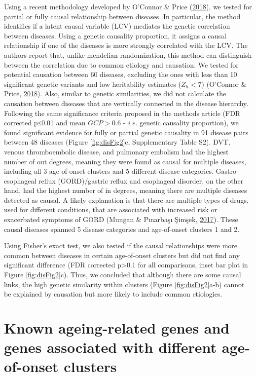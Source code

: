 \documentclass[12pt,twoside]{unicam}
\begin{document}
Using a recent methodology developed by O'Connor \& Price (\protect\hyperlink{ref-OConnor2018}{2018}), we tested for partial or fully causal relationship between diseases. In particular, the method identifies if a latent causal variable (LCV) mediates the genetic correlation between diseases. Using a genetic causality proportion, it assigns a causal relationship if one of the diseases is more strongly correlated with the LCV. The authors report that, unlike mendelian randomization, this method can distinguish between the correlation due to common etiology and causation. We tested for potential causation between 60 diseases, excluding the ones with less than 10 significant genetic variants and low heritability estimates (\(Z_h<7\)) (O'Connor \& Price, \protect\hyperlink{ref-OConnor2018}{2018}). Also, similar to genetic similarities, we did not calculate the causation between diseases that are vertically connected in the disease hierarchy. Following the same significance criteria proposed in the methods article (FDR corrected p≤0.01 and mean \(GCP>0.6\) - \emph{i.e.} genetic causality proportion), we found significant evidence for fully or partial genetic causality in 91 disease pairs between 48 diseases (Figure \ref{fig:disFig2}c, Supplementary Table S2). DVT, venous thromboembolic disease, and pulmonary embolism had the highest number of out degrees, meaning they were found as causal for multiple diseases, including all 3 age-of-onset clusters and 5 different disease categories. Gastro-esophageal reflux (GORD)/gastric reflux and esophageal disorder, on the other hand, had the highest number of in degrees, meaning there are multiple diseases detected as causal. A likely explanation is that there are multiple types of drugs, used for different conditions, that are associated with increased risk or exacerbated symptoms of GORD (Mungan \& Pınarbaşı Şimşek, \protect\hyperlink{ref-Mungan2017}{2017}). These causal diseases spanned 5 disease categories and age-of-onset clusters 1 and 2.

Using Fisher's exact test, we also tested if the causal relationships were more common between diseases in certain age-of-onset clusters but did not find any significant difference (FDR corrected p\textgreater0.1 for all comparisons, inset bar plot in Figure \ref{fig:disFig2}c). Thus, we concluded that although there are some causal links, the high genetic similarity within clusters (Figure \ref{fig:disFig2}a-b) cannot be explained by causation but more likely to include common etiologies.

\hypertarget{known-ageing-related-genes-and-genes-associated-with-different-age-of-onset-clusters}{%
\section{Known ageing-related genes and genes associated with different age-of-onset clusters}\label{known-ageing-related-genes-and-genes-associated-with-different-age-of-onset-clusters}}
\end{document}
